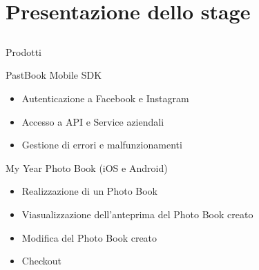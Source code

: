 \section{Presentazione dello stage}
	\subsection{}
		\begin{frame}{Prodotti}
			\begin{block}{PastBook Mobile SDK}
				\begin{itemize}
					\item Autenticazione a Facebook e Instagram
					\item Accesso a API e Service aziendali
					\item Gestione di errori e malfunzionamenti
				\end{itemize}
			\end{block}
			\begin{block}{My Year Photo Book (iOS e Android)}
				\begin{itemize}
					\item Realizzazione di un Photo Book
					\item Viasualizzazione dell'anteprima del Photo Book creato
					\item Modifica del Photo Book creato
					\item Checkout
				\end{itemize}
			\end{block}
		\end{frame}
